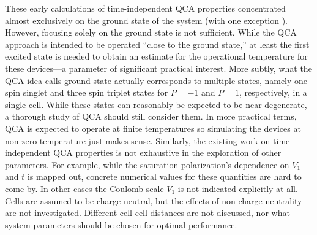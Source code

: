 These early calculations of time-independent QCA properties concentrated almost
exclusively on the ground state of the system (with one exception
\cite{tougaw1993bistable}). However, focusing solely on the ground state is not
sufficient. While the QCA approach is intended to be operated ``close to the
ground state,'' at least the first excited state is needed to obtain an estimate
for the operational temperature for these devices---a parameter of significant
practical interest. More subtly, what the QCA idea calls ground state actually
corresponds to multiple states, namely one spin singlet and three spin triplet
states for $P=-1$ and $P=1$, respectively, in a single cell. While these states
can reasonably be expected to be near-degenerate, a thorough study of QCA should
still consider them. In more practical terms, QCA is expected to operate at
finite temperatures so simulating the devices at non-zero temperature just makes
sense. Similarly, the existing work on time-independent QCA properties is not
exhaustive in the exploration of other parameters. For example, while the
saturation polarization's dependence on $V_1$ and $t$ is mapped out, concrete
numerical values for these quantities are hard to come by. In other cases the
Coulomb scale $V_1$ is not indicated explicitly at all. Cells are assumed to be
charge-neutral, but the effects of non-charge-neutrality are not investigated.
Different cell-cell distances are not discussed, nor what system parameters
should be chosen for optimal performance.


